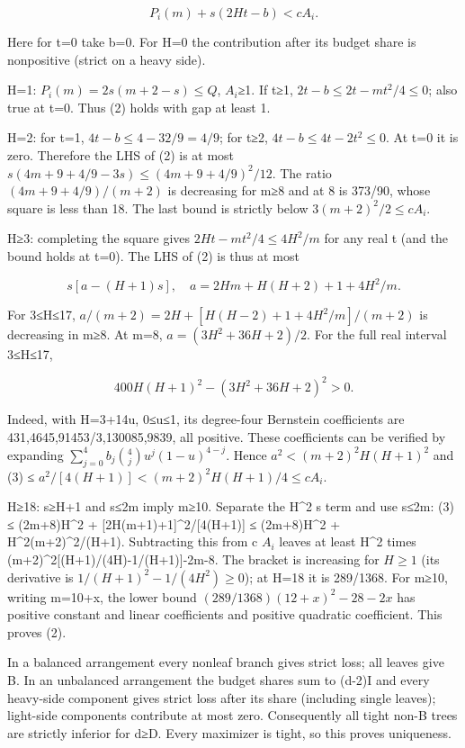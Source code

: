 \documentclass[
  10pt,
  a4paper,
]{article}
\begin{document}
\[P_i(m)+s(2Ht-b)<c A_i.\tag{2}\]

Here for t=0 take b=0. For H=0 the contribution after its budget share
is nonpositive (strict on a heavy side).

H=1: \(P_i(m)=2s(m+2-s)\le Q\), \(A_i\)≥1. If t≥1,
\(2t-b\le 2t-mt^2/4\le0\); also true at t=0. Thus (2) holds with gap at
least 1.

H=2: for t=1, \(4t-b\le4-32/9=4/9\); for t≥2, \(4t-b\le4t-2t^2\le0\). At
t=0 it is zero. Therefore the LHS of (2) is at most
\(s(4m+9+4/9-3s)\le(4m+9+4/9)^2/12\). The ratio \((4m+9+4/9)/(m+2)\) is
decreasing for m≥8 and at 8 is 373/90, whose square is less than 18. The
last bound is strictly below \(3(m+2)^2/2\le c A_i\).

H≥3: completing the square gives \(2Ht-mt^2/4\le4H^2/m\) for any real t
(and the bound holds at t=0). The LHS of (2) is thus at most

\[s[a-(H+1)s],\quad a=2Hm+H(H+2)+1+4H^2/m.\tag{3}\]

For 3≤H≤17, \(a/(m+2)=2H+[H(H-2)+1+4H^2/m]/(m+2)\) is decreasing in m≥8.
At m=8, \(a=(3H^2+36H+2)/2\). For the full real interval 3≤H≤17,

\[400H(H+1)^2-(3H^2+36H+2)^2>0.\]

Indeed, with H=3+14u, 0≤u≤1, its degree-four Bernstein coefficients are
431,4645,91453/3,130085,9839, all positive. These coefficients can be
verified by expanding \(\sum_{j=0}^4 b_j\binom4j u^j(1-u)^{4-j}\). Hence
\(a^2<(m+2)^2H(H+1)^2\) and (3) ≤
\(a^2/[4(H+1)]<(m+2)^2H(H+1)/4\le c A_i\).

H≥18: s≥H+1 and s≤2m imply m≥10. Separate the H\^{}2 s term and use
s≤2m: (3) ≤ (2m+8)H\^{}2 + {[}2H(m+1)+1{]}\^{}2/{[}4(H+1){]} ≤
(2m+8)H\^{}2 + H\^{}2(m+2)\^{}2/(H+1). Subtracting this from c \(A_i\)
leaves at least H\^{}2 times (m+2)\^{}2{[}(H+1)/(4H)-1/(H+1){]}-2m-8.
The bracket is increasing for \(H\ge1\) (its derivative is
\(1/(H+1)^2-1/(4H^2)\ge0\)); at H=18 it is 289/1368. For m≥10, writing
m=10+x, the lower bound \((289/1368)(12+x)^2-28-2x\) has positive
constant and linear coefficients and positive quadratic coefficient.
This proves (2).

In a balanced arrangement every nonleaf branch gives strict loss; all
leaves give B. In an unbalanced arrangement the budget shares sum to
(d-2)I and every heavy-side component gives strict loss after its share
(including single leaves); light-side components contribute at most
zero. Consequently all tight non-B trees are strictly inferior for d≥D.
Every maximizer is tight, so this proves uniqueness.
\end{document}
